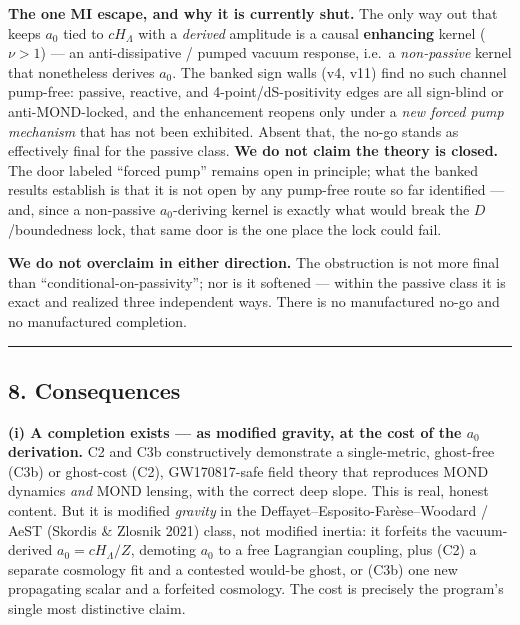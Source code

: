\documentclass[
]{article}
\newcounter{none} %
\begin{document}
\textbf{The one MI escape, and why it is currently shut.} The only way
out that keeps \(a_0\) tied to \(cH_\Lambda\) with a \emph{derived}
amplitude is a causal \textbf{enhancing} kernel (\(\nu>1\)) --- an
anti-dissipative / pumped vacuum response, i.e.~a \emph{non-passive}
kernel that nonetheless derives \(a_0\). The banked sign walls (v4, v11)
find no such channel pump-free: passive, reactive, and
4-point/dS-positivity edges are all sign-blind or anti-MOND-locked, and
the enhancement reopens only under a \emph{new forced pump mechanism}
that has not been exhibited. Absent that, the no-go stands as
effectively final for the passive class. \textbf{We do not claim the
theory is closed.} The door labeled ``forced pump'' remains open in
principle; what the banked results establish is that it is not open by
any pump-free route so far identified --- and, since a non-passive
\(a_0\)-deriving kernel is exactly what would break the
\(D\)/boundedness lock, that same door is the one place the lock could
fail.

\textbf{We do not overclaim in either direction.} The obstruction is not
more final than ``conditional-on-passivity''; nor is it softened ---
within the passive class it is exact and realized three independent
ways. There is no manufactured no-go and no manufactured completion.

\begin{center}\rule{0.5\linewidth}{0.5pt}\end{center}

\subsection{8. Consequences}\label{consequences}

\textbf{(i) A completion exists --- as modified gravity, at the cost of
the \(a_0\) derivation.} C2 and C3b constructively demonstrate a
single-metric, ghost-free (C3b) or ghost-cost (C2), GW170817-safe field
theory that reproduces MOND dynamics \emph{and} MOND lensing, with the
correct deep slope. This is real, honest content. But it is modified
\emph{gravity} in the Deffayet--Esposito-Farèse--Woodard / AeST (Skordis
\& Zlosnik 2021) class, not modified inertia: it forfeits the
vacuum-derived \(a_0=cH_\Lambda/Z\), demoting \(a_0\) to a free
Lagrangian coupling, plus (C2) a separate cosmology fit and a contested
would-be ghost, or (C3b) one new propagating scalar and a forfeited
cosmology. The cost is precisely the program's single most distinctive
claim.
\end{document}
